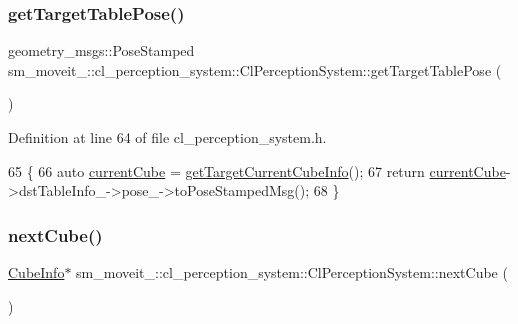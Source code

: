 \subsubsection{\texorpdfstring{get\+Target\+Table\+Pose()}{getTargetTablePose()}}
{\footnotesize\ttfamily geometry\+\_\+msgs\+::\+Pose\+Stamped sm\+\_\+moveit\+\_\+::cl\+\_\+perception\+\_\+system\+::\+Cl\+Perception\+System\+::get\+Target\+Table\+Pose (\begin{DoxyParamCaption}{ }\end{DoxyParamCaption})\hspace{0.3cm}{\ttfamily [inline]}}



Definition at line 64 of file cl\+\_\+perception\+\_\+system.\+h.


\begin{DoxyCode}
65             \{
66                 \textcolor{keyword}{auto} \hyperlink{classsm__moveit__4_1_1cl__perception__system_1_1ClPerceptionSystem_ae2a80b803814af8b3c87f810f2728af0}{currentCube} = \hyperlink{classsm__moveit__4_1_1cl__perception__system_1_1ClPerceptionSystem_ac4b944cebb2055a85a33129665df5dcf}{getTargetCurrentCubeInfo}();
67                 \textcolor{keywordflow}{return} \hyperlink{classsm__moveit__4_1_1cl__perception__system_1_1ClPerceptionSystem_ae2a80b803814af8b3c87f810f2728af0}{currentCube}->dstTableInfo\_->pose\_->toPoseStampedMsg();
68             \}
\end{DoxyCode}
\mbox{\label{classsm__moveit__4_1_1cl__perception__system_1_1ClPerceptionSystem_ab9ee8563cf55a88b34e81a2281da996f}} 
\subsubsection{\texorpdfstring{next\+Cube()}{nextCube()}}
{\footnotesize\ttfamily \hyperlink{structsm__moveit__4_1_1cl__perception__system_1_1CubeInfo}{Cube\+Info}$\ast$ sm\+\_\+moveit\+\_\+::cl\+\_\+perception\+\_\+system\+::\+Cl\+Perception\+System\+::next\+Cube (\begin{DoxyParamCaption}{ }\end{DoxyParamCaption})\hspace{0.3cm}{\ttfamily [inline]}}



